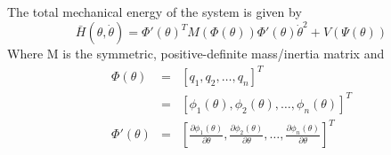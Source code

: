 The total mechanical energy of the system is given by
\begin{equation}
	\bar{H}\left(\theta,\dot{\theta}\right) = \Phi'\left(\theta\right)^T M\left(\Phi\left(\theta\right)\right)
	\Phi'\left(\theta\right)\dot{\theta}^2 + V\left(\Psi\left(\theta\right)\right)
\end{equation}
Where M is the symmetric, positive-definite mass/inertia matrix and
\begin{eqnarray*}
	\Phi\left(\theta\right) &=& \left[ q_1, q_2, \ldots, q_n \right]^T \\
	&=& \left[ \phi_1\left(\theta\right), \phi_2\left(\theta\right), \ldots, \phi_n\left(\theta\right)
	\right]^T \\
	\Phi'\left(\theta\right) &=& \left[ \frac{\partial\phi_1\left(\theta\right)}{\partial\theta},
	\frac{\partial\phi_2\left(\theta\right)}{\partial\theta}, \ldots ,
	\frac{\partial\phi_n\left(\theta\right)}{\partial\theta} \right]^T
\end{eqnarray*}

